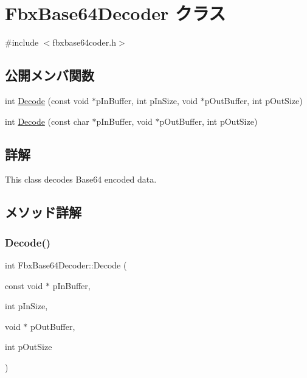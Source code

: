 \hypertarget{class_fbx_base64_decoder}{}\section{Fbx\+Base64\+Decoder クラス}
\label{class_fbx_base64_decoder}


{\ttfamily \#include $<$fbxbase64coder.\+h$>$}

\subsection*{公開メンバ関数}
\begin{DoxyCompactItemize}
\item 
int \hyperlink{class_fbx_base64_decoder_a04ee2ab9e6d914878c565f5e65568761}{Decode} (const void $\ast$p\+In\+Buffer, int p\+In\+Size, void $\ast$p\+Out\+Buffer, int p\+Out\+Size)
\item 
int \hyperlink{class_fbx_base64_decoder_a7fd80ad0699f441dce72f3eff39cddae}{Decode} (const char $\ast$p\+In\+Buffer, void $\ast$p\+Out\+Buffer, int p\+Out\+Size)
\end{DoxyCompactItemize}


\subsection{詳解}
This class decodes Base64 encoded data. 

\subsection{メソッド詳解}
\mbox{\label{class_fbx_base64_decoder_a04ee2ab9e6d914878c565f5e65568761}} 
\subsubsection{\texorpdfstring{Decode()}{Decode()}\hspace{0.1cm}{\footnotesize\ttfamily [1/2]}}
{\footnotesize\ttfamily int Fbx\+Base64\+Decoder\+::\+Decode (\begin{DoxyParamCaption}\item[{const void $\ast$}]{p\+In\+Buffer,  }\item[{int}]{p\+In\+Size,  }\item[{void $\ast$}]{p\+Out\+Buffer,  }\item[{int}]{p\+Out\+Size }\end{DoxyParamCaption})}

